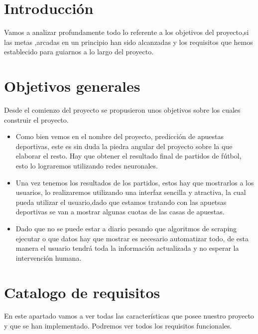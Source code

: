 
\section{Introducción}
Vamos a analizar profundamente  todo lo referente a los objetivos del proyecto,si las metas ,arcadas en un principio han sido alcanzadas y los requisitos que hemos establecido para guiarnos a lo largo del proyecto.
\section{Objetivos generales}
Desde el comienzo del proyecto se propusieron unos objetivos sobre los cuales construir el proyecto.
\begin{itemize}
\item Como bien vemos en el nombre del proyecto, predicción de apuestas deportivas, este es sin duda la piedra angular del proyecto sobre la que elaborar el resto. Hay que obtener el resultado final de partidos de fútbol, esto lo lograremos utilizando redes neuronales.

\item Una vez tenemos los resultados de los partidos, estos hay que mostrarlos a los usuarios, lo realizaremos utilizando una interfaz sencilla y atractiva, la cual pueda utilizar el usuario,dado que estamos tratando con las apuetsas deportivas se van a mostrar algunas cuotas de las casas de apuestas.

\item Dado que no se puede estar a diario pesando que algoritmos de scraping ejecutar o que datos hay que mostrar es necesario automatizar todo, de esta manera el usuario tendrá toda la información actualizada y no esperar la intervención humana.
\end{itemize}
\section{Catalogo de requisitos}
En este apartado vamos a ver todas las características que posee nuestro proyecto y que se han implementado. Podremos ver todos los requisitos funcionales.

